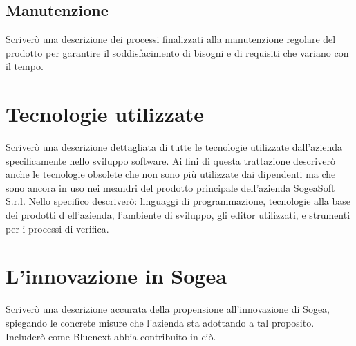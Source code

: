         \subsection{Manutenzione}
        Scriverò una descrizione dei processi finalizzati alla manutenzione regolare del prodotto per
        garantire il soddisfacimento di bisogni e di requisiti che variano con il tempo.
    \section{Tecnologie utilizzate}
    Scriverò una descrizione dettagliata di tutte le tecnologie utilizzate dall’azienda specificamente nello
    sviluppo software. Ai fini di questa trattazione descriverò anche le tecnologie obsolete che non sono
    più utilizzate dai dipendenti ma che sono ancora in uso nei meandri del prodotto principale
    dell’azienda SogeaSoft S.r.l.
    Nello specifico descriverò: linguaggi di programmazione, tecnologie alla base dei prodotti
    d   ell’azienda, l’ambiente di sviluppo, gli editor utilizzati, e       strumenti per i processi di verifica.
    \section{L’innovazione in Sogea}
    Scriverò una descrizione accurata della propensione all’innovazione di Sogea, spiegando le concrete
    misure che l’azienda sta adottando a tal proposito. Includerò come Bluenext abbia contribuito in ciò.